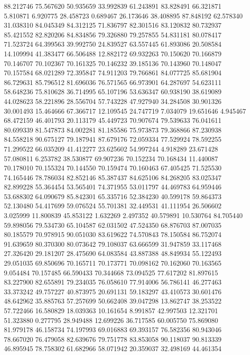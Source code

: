88.212746
75.567620
50.935659
33.992839
61.243891
83.828491
66.321871
5.810871
6.920775
28.458723
0.689467
26.173646
38.408895
87.848192
62.578340
31.038310
84.045349
84.312125
71.836797
82.301516
83.120832
80.732937
85.421552
82.820206
84.834856
79.326880
79.257855
54.831181
80.078417
71.523724
64.399563
39.992750
24.839527
63.557445
61.893086
20.508584
14.109994
41.383477
66.506488
12.882172
69.932263
70.150620
70.166879
70.146707
70.102367
70.161325
70.146232
39.185136
70.143960
70.148047
70.157584
68.021289
72.395847
74.911203
79.766861
84.077725
85.681904
86.729631
85.796512
81.696036
76.571565
66.973901
64.287697
54.623111
58.648236
75.810628
36.714995
65.107196
53.636347
60.938190
38.619089
44.028623
58.221896
28.556704
57.743228
47.927940
34.284508
30.901326
30.001493
15.464666
67.366717
12.109545
24.747719
7.034079
19.651646
4.945467
68.472159
46.401793
20.113179
45.449723
70.907674
79.539633
76.041611
80.699339
81.547873
84.002281
81.185586
75.973873
79.368866
87.230938
84.558218
90.675127
79.187941
87.679176
72.059334
77.529924
78.592255
71.299522
66.035209
41.412277
23.625602
54.997244
4.918289
23.671428
57.080811
6.253782
38.530877
69.907236
70.152234
70.168434
11.440087
70.178010
70.155324
70.144550
70.159474
70.160463
67.405425
71.525530
74.165446
78.786034
82.852146
85.387437
84.625106
84.268205
83.025347
82.899228
55.364454
53.565401
74.371955
53.011797
44.469783
64.959446
53.688302
64.090679
85.842301
65.335716
52.384230
40.599178
59.864373
52.130480
54.417699
59.076524
55.701381
32.449531
41.111954
26.506602
3.025999
11.800839
45.853122
1.632269
2.497352
40.579891
10.530764
84.705440
59.898056
79.534730
65.104587
62.031502
47.524350
68.876703
87.007035
80.185579
70.978915
90.051030
83.619622
74.570843
78.150584
86.752074
91.639659
80.370300
80.073642
79.108037
63.666599
31.947859
33.117468
27.326420
29.181207
28.475690
64.083584
43.887388
48.849934
55.122493
29.051035
69.850696
70.165711
70.173771
70.098162
70.162060
70.163565
9.054484
70.157485
66.590433
70.344668
73.094525
77.617202
81.897615
83.227900
82.655891
79.234035
76.058610
77.914006
56.786141
46.277463
33.373242
49.757227
40.873975
20.691131
59.183297
43.410573
30.601476
48.642962
35.885763
57.257699
50.662408
39.047298
13.862747
38.253522
57.722466
16.580829
18.039363
10.161654
8.991857
42.997503
12.321701
51.323880
0.277795
28.949488
12.699226
36.717585
60.005750
75.869080
81.979178
46.158734
74.197993
69.016883
69.393157
76.582356
80.943046
78.667020
76.479058
82.639676
79.751778
83.853058
90.118037
90.813339
46.895945
78.758302
61.682966
58.071942
20.359037
32.498169
44.461354
